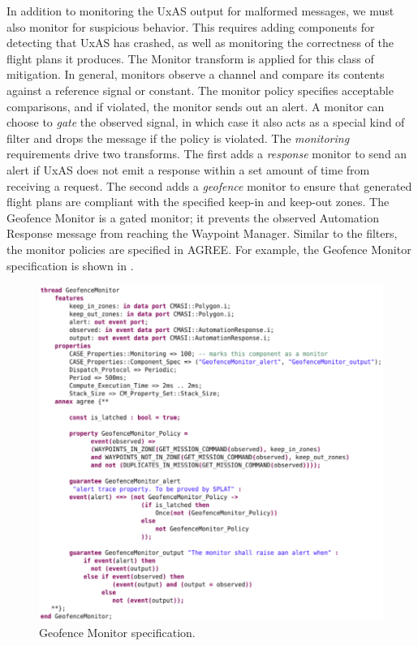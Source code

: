 In addition to monitoring the UxAS output for malformed messages, we must also monitor for suspicious behavior.  This requires adding components for detecting that UxAS has crashed, as well as monitoring the correctness of the flight plans it produces.  The Monitor transform is applied for this class of mitigation.  In general, monitors observe a channel and compare its contents against a reference signal or constant.  The monitor policy specifies acceptable comparisons, and if violated, the monitor sends out an alert.  A monitor can choose to \textit{gate} the observed signal, in which case it also acts as a special kind of filter and drops the message if the policy is violated.  The \textit{monitoring} requirements drive two transforms.  The first adds a \textit{response} monitor to send an alert if UxAS does not emit a response within a set amount of time from receiving a request.  The second adds a \textit{geofence} monitor to ensure that generated flight plans are compliant with the specified keep-in and keep-out zones.  The Geofence Monitor is a gated monitor; it prevents the observed Automation Response message from reaching the Waypoint Manager. 
%
Similar to the filters, the monitor policies are specified in AGREE. For example, 
the Geofence Monitor specification is shown in . 


\begin{figure}[h]
	\centering
	\includegraphics[width=1\columnwidth]{figs/geofence-monitor.png}
	\caption{Geofence Monitor specification.} 
	\label{fig:geofence-monitor} 
\end{figure}

